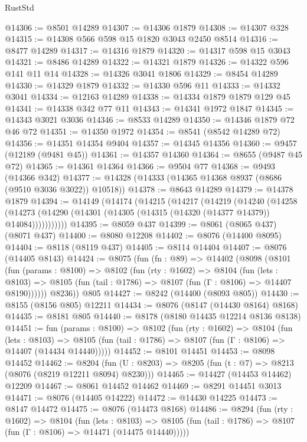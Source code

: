 \begin{lexlean}{RustStd}
\begin{coremodule}
@14306 := @8501 @14289
@14307 := @14306 @1879
@14308 := @14307 @328
@14315 := @14308 @566 @598 @15 @1820 @3043 @2450 @8514
@14316 := @8477 @14289
@14317 := @14316 @1879
@14320 := @14317 @598 @15 @3043
@14321 := @8486 @14289
@14322 := @14321 @1879
@14326 := @14322 @596 @141 @11 @14
@14328 := @14326 @3041 @1806
@14329 := @8454 @14289
@14330 := @14329 @1879
@14332 := @14330 @596 @11
@14333 := @14332 @3041
@14334 := @12163 @14289
@14338 := @14334 @1879 @1879 @129 @45
@14341 := @14338 @342 @77 @11
@14343 := @14341 @1972 @1847
@14345 := @14343 @3021 @3036
@14346 := @8533 @14289
@14350 := @14346 @1879 @72 @46 @72
@14351 := @14350 @1972
@14354 := @8541 (@8542 @14289 @72)
@14356 := @14351 @14354 @9404
@14357 := @14345 @14356
@14360 := @9457 (@12189 (@9481 @45))
@14361 := @14357 @14360
@14364 := @8655 (@9487 @45 @72)
@14365 := @14361 @14364
@14366 := @9504 @77
@14368 := @9493 (@14366 @342)
@14377 := @14328 (@14333 (@14365 @14368 @8937 (@8686 (@9510 @3036 @3022)) @10518))
@14378 := @8643 @14289
@14379 := @14378 @1879
@14394 := @14149
    (@14174
      (@14215
        (@14217
          (@14219
            (@14240
              (@14258
                (@14273 (@14290 (@14301 (@14305 (@14315 (@14320 (@14377 @14379)) @14084)))))))))))
@14395 := @8059 @437
@14399 := @8061 (@8065 @437) (@8071 @437)
@14400 := @8080 @12208
@14402 := @8076 (@14400 @8095)
@14404 := @8118 (@8119 @437)
@14405 := @8114 @14404
@14407 := @8076 (@14405 @8143)
@14424 := @8075
    (fun (fn : @89) =>
    @14402
      (@8098
        (@8101
          (fun (params : @8100) =>
          @8102
            (fun (rty : @1602) =>
            @8104
              (fun (lets : @8103) =>
              @8105 (fun (tail : @1786) => @8107 (fun (Γ : @8106) => @14407 @8190))))))
        @8236))
    @805
@14427 := @8242 (@14400 (@8093 @805))
@14430 := @8155 (@8156 @805) @12211
@14434 := @8076 (@8147 (@14430 @8164) @8168)
@14435 := @8181 @805
@14440 := @8178 (@8180 @14435 @12214 @8136 @8138)
@14451 := fun (params : @8100) =>
  @8102
    (fun (rty : @1602) =>
    @8104
      (fun (lets : @8103) =>
      @8105 (fun (tail : @1786) => @8107 (fun (Γ : @8106) => @14407 (@14434 @14440)))))
@14452 := @8101 @14451
@14453 := @8098 @14452
@14462 := @8204
    (fun (U : @8203) => @8205 (fun (t : @7) => @8213 (@8076 (@8219 @12211 @8094) @8230)))
@14465 := @14427 (@14453 @14462) @12209
@14467 := @8061 @14452 @14462
@14469 := @8291 @14451 @3013
@14471 := @8076 (@14405 @14222)
@14472 := @14430 @14225
@14473 := @8147 @14472
@14475 := @8076 (@14473 @8168)
@14486 := @8294
    (fun (rty : @1602) =>
    @8104
      (fun (lets : @8103) =>
      @8105 (fun (tail : @1786) => @8107 (fun (Γ : @8106) => @14471 (@14475 @14440)))))

\end{coremodule}
\end{lexlean}

